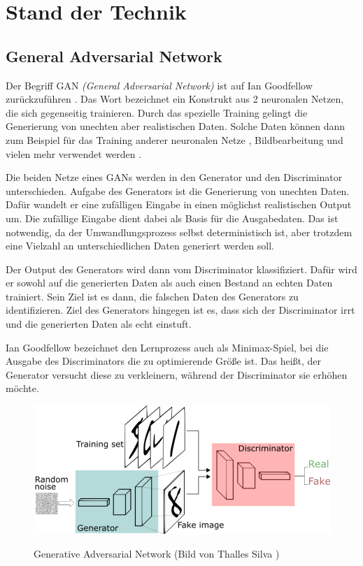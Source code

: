 
\chapter{Stand der Technik}

\section{General Adversarial Network}

Der Begriff GAN \textit{(General Adversarial Network)} ist auf Ian Goodfellow zurückzuführen \cite{gan-original-paper}.
Das Wort bezeichnet ein Konstrukt aus 2 neuronalen Netzen, die sich gegenseitig trainieren.
Durch das spezielle Training gelingt die Generierung von unechten aber realistischen Daten.
Solche Daten können dann zum Beispiel für das Training anderer neuronalen Netze \cite{gan-application-augmenting-training-data}, Bildbearbeitung \cite{gan-application-upscaling, gan-application-blending} und vielen mehr verwendet werden \cite{gan-application-dna-optimizes-protein-functions, gan-application-audio-synthesis}.
\newline

Die beiden Netze eines GANs werden in den Generator und den Discriminator unterschieden.
Aufgabe des Generators ist die Generierung von unechten Daten.
Dafür wandelt er eine zufälligen Eingabe in einen möglichst realistischen Output um.
Die zufällige Eingabe dient dabei als Basis für die Ausgabedaten.
Das ist notwendig, da der Umwandlungsprozess selbst deterministisch ist, aber trotzdem eine Vielzahl an unterschiedlichen Daten generiert werden soll.

Der Output des Generators wird dann vom Discriminator klassifiziert.
Dafür wird er sowohl auf die generierten Daten als auch einen Bestand an echten Daten trainiert.
Sein Ziel ist es dann, die falschen Daten des Generators zu identifizieren.
Ziel des Generators hingegen ist es, dass sich der Discriminator irrt und die generierten Daten als echt einstuft.

Ian Goodfellow bezeichnet den Lernprozess auch als Minimax-Spiel, bei die Ausgabe des Discriminators die zu optimierende Größe ist.
Das heißt, der Generator versucht diese zu verkleinern, während der Discriminator sie erhöhen möchte. \cite{gan-minimax} 

\begin{figure}[H]
	\centering
	\includegraphics[width=12cm]{kapitel/2_stand_der_technik/img/GAN.png}
	\label{img:gan}
	\caption{Generative Adversarial Network (Bild von Thalles Silva \cite{img-gan})}
\end{figure}

